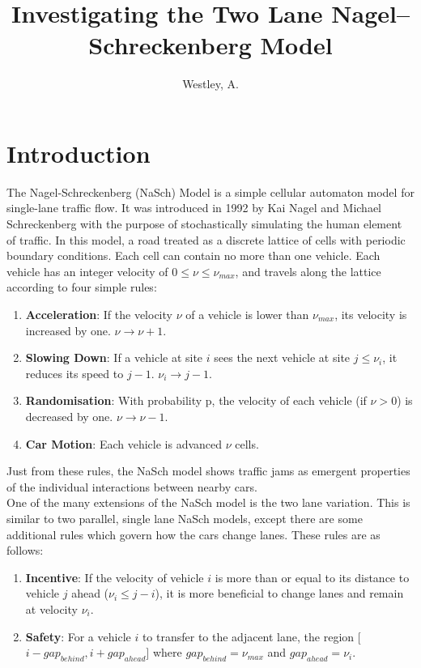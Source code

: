 \documentclass[11pt]{article}
\title{Investigating the Two Lane Nagel–Schreckenberg Model}
\author{Westley, A.}
\date{\vspace{-5ex}}
\begin{document}
	
	\maketitle 
	
	\hfill \break
	
	\section*{Introduction}
	
	The Nagel-Schreckenberg (NaSch) Model is a simple cellular automaton model for single-lane traffic flow. It was introduced in 1992 by Kai Nagel and Michael Schreckenberg \cite{nagel1992cellular} with the purpose of stochastically simulating the human element of traffic. In this model, a road treated as a discrete lattice of cells with periodic boundary conditions. Each cell can contain no more than one vehicle. Each vehicle has an integer velocity of $0 \leq \nu \leq \nu_{max}$, and travels along the lattice according to four simple rules: 
	
	\begin{enumerate}
		\item \textbf{Acceleration}: If the velocity $\nu$ of a vehicle is lower than $\nu_{max}$, its velocity is increased by one. $\nu \rightarrow \nu + 1$.
		\item \textbf{Slowing Down}: If a vehicle at site $i$ sees the next vehicle at site $j \leq \nu_i$, it reduces its speed to $j-1$. $\nu_i \rightarrow j-1$.
		\item \textbf{Randomisation}: With probability p, the velocity of each vehicle (if $\nu > 0$) is decreased by one. $\nu \rightarrow \nu - 1$.
		\item \textbf{Car Motion}: Each vehicle is advanced $\nu$ cells.
	\end{enumerate}
	
	Just from these rules, the NaSch model shows traffic jams as emergent properties of the individual interactions between nearby cars. \\
	
	One of the many extensions of the NaSch model is the two lane variation. This is similar to two parallel, single lane NaSch models, except there are some additional rules which govern how the cars change lanes\cite{wright2013flow}. These rules are as follows:
	
	\begin{enumerate}
		\item \textbf{Incentive}: If the velocity of vehicle $i$ is more than or equal to its distance to vehicle $j$ ahead ($\nu_i \leq j-i$), it is more beneficial to change lanes and remain at velocity $\nu_i$.
		\item \textbf{Safety}: For a vehicle $i$ to transfer to the adjacent lane, the region [$i-gap_{behind}, i+gap_{ahead}]$ where $gap_{behind} = \nu_{max}$ and $gap_{ahead} = \nu_i$.
	\end{enumerate}
	
\end{document}
